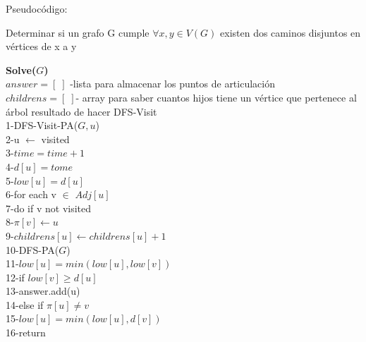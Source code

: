 \documentclass{article}
\begin{document}
    \begin{algorithm}[H] 
        Pseudoc\'odigo:
        \caption{Determinar si un grafo G cumple $\forall x,y\in V(G)$  existen dos caminos disjuntos en v\'ertices de x a y }
        \textbf{Solve($G$)\\}
        $answer=[\;]$ -lista para almacenar los puntos de articulaci\'on\\
        $childrens=[\;]$- array para saber cuantos hijos tiene un v\'ertice que pertenece al \'arbol resultado de hacer DFS-Visit\\
        1-\hspace*{1em}DFS-Visit-PA($G,u$) \\ 
        2-\hspace*{2em}u $\leftarrow$ visited \\
        3-\hspace*{2em}$time=time+1$ \\
        4-\hspace*{2em}$d[u]=tome$\\
        5-\hspace*{2em}$low[u]=d[u]$\\ 
        6-\hspace*{2em}for each v $\in$ $Adj[u]$\\
        7-\hspace*{3em}do if v not visited\\
        8-\hspace*{4em}$\pi[v] \leftarrow u$\\
        9-\hspace*{4em}$childrens[u] \leftarrow childrens[u]+1$\\
        10-\hspace*{4em}DFS-PA($G$)\\
        11-\hspace*{4em}$low[u]=min(low[u],low[v])$\\
        12-\hspace*{4em}if $low[v]\ge d[u]$\\
        13-\hspace*{5em}answer.add(u)\\
        14-\hspace*{3em}else if $\pi[u]\ne v$\\
        15-\hspace*{4em}$low[u]=min(low[u],d[v])$\\ 
        16-\hspace*{2em}return\\\\

\end{algorithm}
\end{document}
